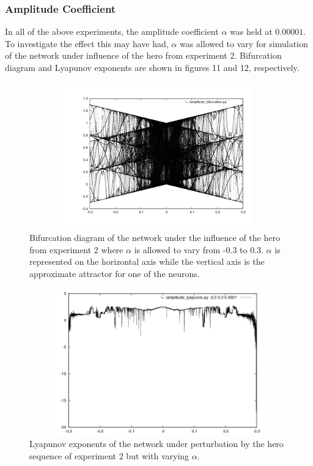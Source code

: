 \documentclass[12pt]{article}
\begin{document}
\subsubsection{Amplitude Coefficient}
In all of the above experiments, the amplitude coefficient $\alpha$ was
held at $0.00001$.  To investigate the effect this may have had, $\alpha$
was allowed to vary for simulation of the network under influence of the
hero from experiment 2.  Bifurcation diagram and Lyapunov exponents are
shown in figures 11 and 12, respectively.

\begin{figure}[htb]
\begin{center}
\includegraphics[height=2.5in,width=4.5in]{images/big_bifurcation.png}
\caption{Bifurcation diagram of the network under the influence of the hero from experiment 2 where $\alpha$ is allowed to vary from -0.3 to 0.3.  $\alpha$ is represented on the horizontal axis while the vertical axis is the approximate attractor for one of the neurons.}
\end{center}
\end{figure}
\begin{figure}[htb]
\begin{center}
\includegraphics[height=2.5in,width=4.5in]{images/big_lyapunov.png}
\caption{Lyapunov exponents of the network under perturbation by the hero sequence of experiment 2 but with varying $\alpha$.}
\end{center}
\end{figure}
\end{document}
